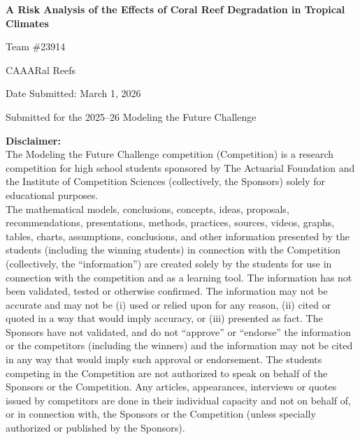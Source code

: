 \documentclass[10pt,letterpaper]{article}
\begin{document}
\begin{titlepage}
    \centering
    \vspace*{1.5in}
    {\LARGE\bfseries A Risk Analysis of the Effects of Coral Reef Degradation in Tropical Climates \par}
    \vspace{1em}
    {\Large Team \#23914 \par}
    \vspace{1em}
    {\Large CAAARal Reefs \par}
    \vspace{1em}
    {\large Date Submitted: March 1, 2026 \par}
    \vspace{1em}
    {\normalsize Submitted for the 2025--26 Modeling the Future Challenge \par}
    \vfill
    {\tiny
    \color{red}
    \begin{flushleft}
    \textbf{Disclaimer:}\\
    The Modeling the Future Challenge competition (Competition) is a research competition for high school students sponsored by The Actuarial Foundation and the Institute of Competition Sciences (collectively, the Sponsors) solely for educational purposes. \\

    The mathematical models, conclusions, concepts, ideas, proposals, recommendations, presentations, methods, practices, sources, videos, graphs, tables, charts, assumptions, conclusions, and other information presented by the students (including the winning students) in connection with the Competition (collectively, the ``information'') are created solely by the students for use in connection with the competition and as a learning tool. The information has not been validated, tested or otherwise confirmed. The information may not be accurate and may not be (i) used or relied upon for any reason, (ii) cited or quoted in a way that would imply accuracy, or (iii) presented as fact. The Sponsors have not validated, and do not ``approve'' or ``endorse'' the information or the competitors (including the winners) and the information may not be cited in any way that would imply such approval or endorsement. The students competing in the Competition are not authorized to speak on behalf of the Sponsors or the Competition. Any articles, appearances, interviews or quotes issued by competitors are done in their individual capacity and not on behalf of, or in connection with, the Sponsors or the Competition (unless specially authorized or published by the Sponsors). \\


\end{flushleft}}
\end{titlepage}
\end{document}
